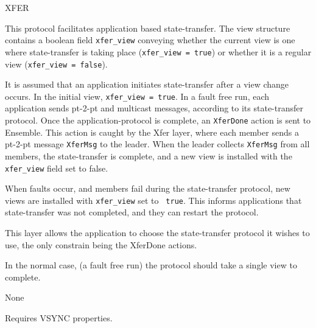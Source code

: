 %
%
%
\begin{Layer}{XFER}

This protocol facilitates application based state-transfer. 
The view structure contains a boolean field {\tt xfer\_view}
conveying whether the current view is one where
state-transfer is taking place ({\tt xfer\_view = true}) or whether it 
is a regular view ({\tt xfer\_view = false}).

\begin{Protocol}
It is assumed that an application initiates state-transfer after a view
change occurs. In the initial view, {\tt xfer\_view = true}. 
In a fault free run, 
each application sends pt-2-pt and multicast messages, according
to its state-transfer protocol. Once the application-protocol is
complete, an {\tt XferDone} action is sent to Ensemble. 
This action is caught by the Xfer layer, where each member sends a pt-2-pt
message {\tt XferMsg} to the leader. When the leader
collects {\tt XferMsg} from all members, the state-transfer is
complete, and a new view is installed with the {\tt xfer\_view} field
set to false. 

When faults occur, and members fail during the state-transfer
protocol, new views are installed with {\tt xfer\_view} set to {\tt
true}. This informs applications that state-transfer was not
completed, and they can restart the protocol. 
\end{Protocol}

\begin{Notes}
\item 
This layer allows the application to choose
the state-transfer protocol it wishes to use, the only constrain being
the XferDone actions. 

\item 
In the normal case, (a fault free run) the protocol should take a 
single view to complete. 
\end{Notes}

\begin{Parameters}
\item None
\end{Parameters}

\begin{Properties}
\item
Requires VSYNC properties.
\end{Properties}

\begin{Sources}
\end{Sources}

\end{Layer}

